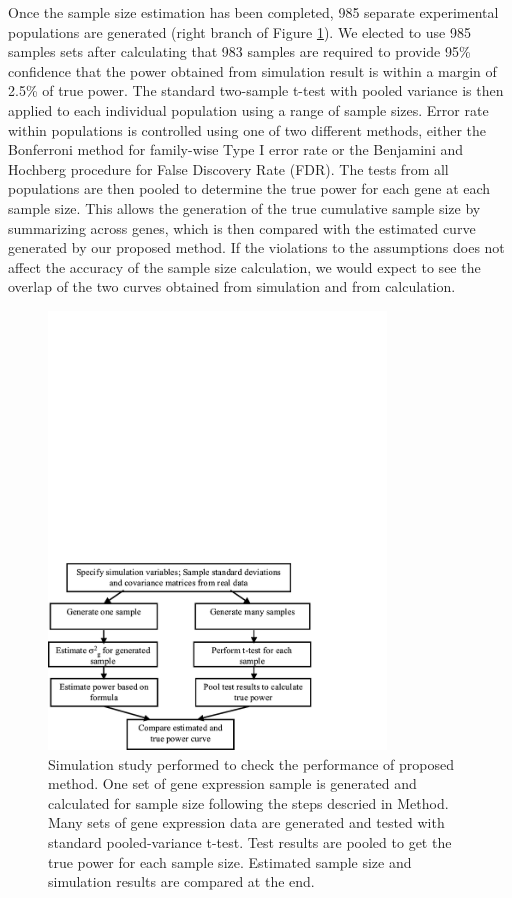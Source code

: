 \documentclass[12pt]{article}
\begin{document}
Once the sample size estimation has been completed, 985 separate
experimental populations are generated (right branch of Figure
\ref{fig:SimuFC}).  We elected to use 985 samples sets after
calculating that 983 samples are required to provide 95\%
confidence that the power obtained from simulation result is
within a margin of 2.5\% of true power.  The standard two-sample
t-test with pooled variance is then applied to each individual
population using a range of sample sizes.  Error rate within
populations is controlled using one of two different methods,
either the Bonferroni method for family-wise Type I error rate or
the Benjamini and Hochberg procedure \citeyearpar{Benjamini95} for
False Discovery Rate (FDR). The tests from all populations are
then pooled to determine the true power for each gene at each
sample size. This allows the generation of the true cumulative
sample size by summarizing across genes, which is then compared
with the estimated curve generated by our proposed method.  If the
violations to the assumptions does not affect the accuracy of the
sample size calculation, we would expect to see the overlap of the
two curves obtained from simulation and from calculation.

\begin{figure}%
  \caption[Flow Chart for Simulation Study]{ Simulation study
  performed to check the performance of proposed method.  One set of
  gene expression sample is generated and calculated for sample size
  following the steps descried in Method. Many sets of gene
  expression data are generated and tested with standard
  pooled-variance t-test. Test results are pooled to get
  the true power for each sample size. Estimated sample size and
  simulation results are compared at the end.}
  \label{fig:SimuFC}
  \vspace{0.1in}
  \centerline{\includegraphics*[width=0.8\textwidth]{SimuFC.pdf}}
\end{figure}
\end{document}

